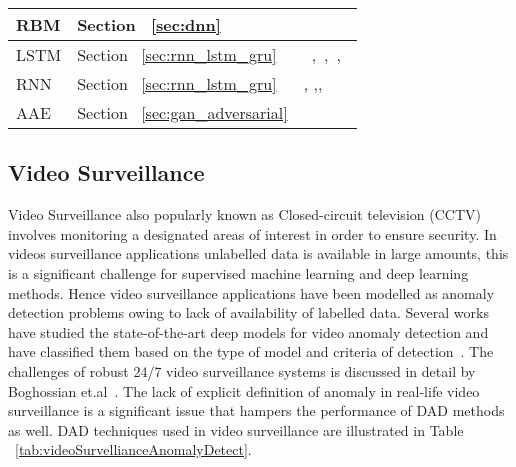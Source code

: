 \begin{table*}
\begin{center}
{\begin{tabular}{ | p{3cm} | p{4cm} | p{12cm} |}
      RBM &Section ~\ref{sec:dnn}   & \cite{munawar2017spatio}\\\hline
      LSTM &Section ~\ref{sec:rnn_lstm_gru}  &~\cite{medel2016anomaly},~\cite{luo2017remembering},~\cite{ben2018attentioned},~\cite{singh2017anomaly}\\\hline
      RNN & Section ~\ref{sec:rnn_lstm_gru} &\cite{luo2017revisit},\cite{zhou2015abnormal} ,\cite{hu2016video},~\cite{chong2015modeling}\\\hline
      AAE & Section ~\ref{sec:gan_adversarial} & ~\cite{ravanbakhsh2017training}\\\hline
    \end{tabular}}
  \end{center}
\end{table*}


\subsection{Video Surveillance}
Video Surveillance also popularly known as Closed-circuit television (CCTV) involves monitoring a designated areas of interest in order to ensure security. In videos surveillance applications unlabelled data is available in large amounts, this is a significant challenge for supervised machine learning and deep learning methods. Hence video surveillance applications have been modelled as anomaly detection problems owing to lack of availability of labelled data. Several works have studied the state-of-the-art deep models for video anomaly detection and  have classified them based on the type of model and criteria of detection~\cite{kiran2018overview,chong2015modeling}. The challenges of robust 24/7 video surveillance systems is discussed in detail by Boghossian et.al~\cite{boghossian2005challenges}. The lack of  explicit definition of anomaly in real-life video surveillance is a significant issue that hampers the performance of DAD methods as well. DAD techniques used in  video surveillance  are illustrated  in Table ~\ref{tab:videoSurvellianceAnomalyDetect}.







